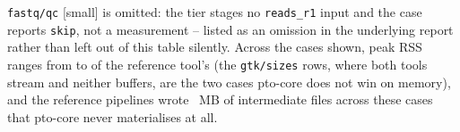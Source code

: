 \begin{table}[t]
\vspace{2pt}
\raggedright\footnotesize
\texttt{fastq/qc} [small] is omitted: the tier stages no \texttt{reads\_r1}
input and the case reports \texttt{skip}, not a measurement -- listed as an
omission in the underlying report rather than left out of this table
silently. Across the \NumBenchCases{} cases shown, peak RSS ranges from
\RssRangeLow{} to \RssRangeHigh{} of the reference tool's (the
\texttt{gtk/sizes} rows, where both tools stream and neither buffers,
are the two cases pto-core does not win on memory), and the reference
pipelines wrote \IntermediateBytesAvoided{}~MB of intermediate files across
these cases that pto-core never materialises at all.
\end{table}

